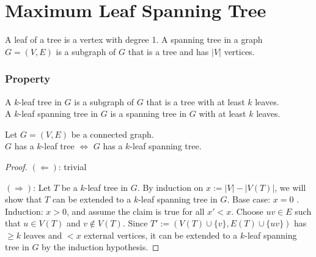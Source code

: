 \section{Maximum Leaf Spanning Tree}

\begin{frame}
 
 A \alert{leaf} of a tree is a vertex with degree 1.
 A \alert{spanning tree} in a graph $G=(V,E)$ is a subgraph of $G$ that is a tree and has $|V|$ vertices.\\
 
\end{frame}


\begin{frame}
	\frametitle{Property}
	
	A \alert{$k$-leaf tree} in $G$ is a subgraph of $G$ that is a tree with at least $k$ leaves.\\
	A \alert{$k$-leaf spanning tree} in $G$ is a spanning tree in $G$ with at least $k$ leaves.
	\begin{lemma}
		Let $G=(V,E)$ be a connected graph.\\
		$G$ has a $k$-leaf tree $\Leftrightarrow$ $G$ has a $k$-leaf spanning tree.
	\end{lemma}
	\begin{proof}
	 $(\Leftarrow)$: trivial
	 
	 $(\Rightarrow)$: Let $T$ be a $k$-leaf tree in $G$. By induction on $x := |V|-|V(T)|$, we will show that $T$ can be extended to a $k$-leaf spanning tree in $G$.\newline
	 Base case: $x=0$ \checkmark.\newline
	 Induction: $x>0$, and assume the claim is true for all $x'<x$. Choose $uv\in E$ such that $u\in V(T)$ and $v\notin V(T)$. Since $T' := (V(T)\cup\{v\},E(T)\cup\{uv\})$ has $\ge k$ leaves and $<x$ external vertices, it can be extended to a $k$-leaf spanning tree in $G$ by the induction hypothesis.
	\end{proof}
\end{frame}


